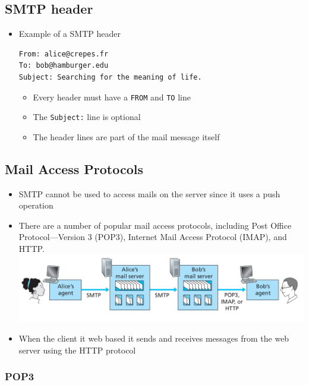 \documentclass[11pt]{article}
\makeatletter
\def\maxwidth{\ifdim\Gin@nat@width>\linewidth\linewidth
    \else\Gin@nat@width\fi}
\let\Oldincludegraphics\includegraphics
\renewcommand{\includegraphics}[1]{\Oldincludegraphics[width=.8\maxwidth]{#1}}
\providecommand{\tightlist}{%
      \setlength{\itemsep}{0pt}\setlength{\parskip}{0pt}}
\makeatother
\begin{document}
    \subsection{SMTP header}\label{smtp-header}

\begin{itemize}
\item
  Example of a SMTP header

\begin{verbatim}
From: alice@crepes.fr
To: bob@hamburger.edu
Subject: Searching for the meaning of life.
\end{verbatim}

  \begin{itemize}
  \tightlist
  \item
    Every header must have a \texttt{FROM} and \texttt{TO} line
  \item
    The \texttt{Subject:} line is optional
  \item
    The header lines are part of the mail message itself
  \end{itemize}
\end{itemize}

    \subsection{Mail Access Protocols}\label{mail-access-protocols}

\begin{itemize}
\item
  SMTP cannot be used to access mails on the server since it uses a push
  operation
\item
  There are a number of popular mail access protocols, including Post
  Office Protocol---Version 3 (POP3), Internet Mail Access Protocol
  (IMAP), and HTTP. \includegraphics{img/mail_access.png}
\item
  When the client it web based it sends and receives messages from the
  web server using the HTTP protocol
\end{itemize}

    \subsubsection{POP3}\label{pop3}
\end{document}
